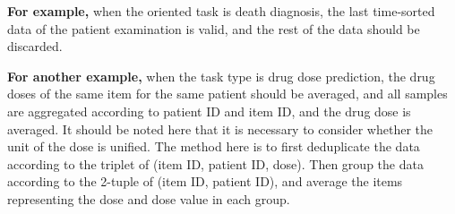 \textbf{For example,} when the oriented task is death diagnosis, the last time-sorted data of the patient examination is valid, and the rest of the data should be discarded. 

\textbf{For another example,} when the task type is drug dose prediction, the drug doses of the same item for the same patient should be averaged, and all samples are aggregated according to patient ID and item ID, and the drug dose is averaged. It should be noted here that it is necessary to consider whether the unit of the dose is unified. The method here is to first deduplicate the data according to the triplet of (item ID, patient ID, dose). Then group the data according to the 2-tuple of (item ID, patient ID), and average the items representing the dose and dose value in each group.

